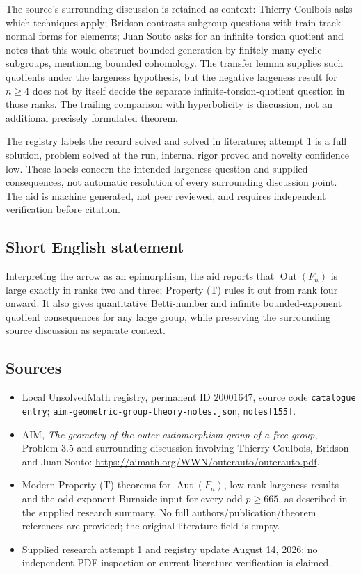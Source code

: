 \documentclass[11pt]{article}
\begin{document}
The source's surrounding discussion is retained as context: Thierry Coulbois asks which techniques apply; Bridson contrasts subgroup questions with train-track normal forms for elements; Juan Souto asks for an infinite torsion quotient and notes that this would obstruct bounded generation by finitely many cyclic subgroups, mentioning bounded cohomology. The transfer lemma supplies such quotients under the largeness hypothesis, but the negative largeness result for \(n\ge4\) does not by itself decide the separate infinite-torsion-quotient question in those ranks. The trailing comparison with hyperbolicity is discussion, not an additional precisely formulated theorem.

The registry labels the record solved and solved in literature; attempt 1 is a full solution, problem solved at the run, internal rigor proved and novelty confidence low. These labels concern the intended largeness question and supplied consequences, not automatic resolution of every surrounding discussion point. The aid is machine generated, not peer reviewed, and requires independent verification before citation.
\subsection{Short English statement}
Interpreting the arrow as an epimorphism, the aid reports that \(\operatorname{Out}(F_n)\) is large exactly in ranks two and three; Property (T) rules it out from rank four onward. It also gives quantitative Betti-number and infinite bounded-exponent quotient consequences for any large group, while preserving the surrounding source discussion as separate context.
\subsection{Sources}
\begin{itemize}
\item Local UnsolvedMath registry, permanent ID \(20001647\), source code \texttt{catalogue entry}; \texttt{aim-geometric-group-theory-notes.json}, \texttt{notes[155]}.
\item AIM, \emph{The geometry of the outer automorphism group of a free group}, Problem 3.5 and surrounding discussion involving Thierry Coulbois, Bridson and Juan Souto: \url{https://aimath.org/WWN/outerauto/outerauto.pdf}.
\item Modern Property (T) theorems for \(\operatorname{Aut}(F_n)\), low-rank largeness results and the odd-exponent Burnside input for every odd \(p\ge665\), as described in the supplied research summary. No full authors/publication/theorem references are provided; the original literature field is empty.
\item Supplied research attempt 1 and registry update August 14, 2026; no independent PDF inspection or current-literature verification is claimed.
\end{itemize}
\end{document}
